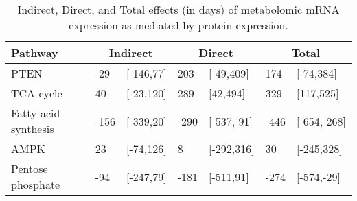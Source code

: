\begin{table}[ht]
\centering
\begin{tabular}{lllllll}
  \hline
  Pathway & \multicolumn{2}{c}{Indirect} & \multicolumn{2}{c}{Direct}  & \multicolumn{2}{c}{Total} \\
 \hline
PTEN & -29 & [-146,77] & 203 & [-49,409] & 174 & [-74,384] \\ 
  TCA cycle & 40 & [-23,120] & 289 & [42,494] & 329 & [117,525] \\ 
  Fatty acid synthesis & -156 & [-339,20] & -290 & [-537,-91] & -446 & [-654,-268] \\ 
  AMPK & 23 & [-74,126] & 8 & [-292,316] & 30 & [-245,328] \\ 
  Pentose phosphate & -94 & [-247,79] & -181 & [-511,91] & -274 & [-574,-29] \\ 
   \hline
\end{tabular}
\caption{Indirect, Direct, and Total effects (in days) of metabolomic mRNA expression as mediated by protein expression.\label{tab:tcga_results}} 
\end{table}
